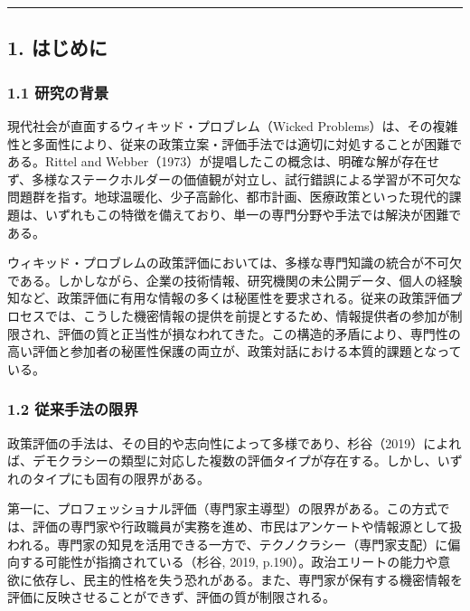 \begin{center}\rule{0.5\linewidth}{0.5pt}\end{center}

\subsection{1. はじめに}\label{ux306fux3058ux3081ux306b}

\subsubsection{1.1 研究の背景}\label{ux7814ux7a76ux306eux80ccux666f}

現代社会が直面するウィキッド・プロブレム（Wicked Problems）は、その複雑性と多面性により、従来の政策立案・評価手法では適切に対処することが困難である。Rittel and Webber（1973）が提唱したこの概念は、明確な解が存在せず、多様なステークホルダーの価値観が対立し、試行錯誤による学習が不可欠な問題群を指す。地球温暖化、少子高齢化、都市計画、医療政策といった現代的課題は、いずれもこの特徴を備えており、単一の専門分野や手法では解決が困難である。

ウィキッド・プロブレムの政策評価においては、多様な専門知識の統合が不可欠である。しかしながら、企業の技術情報、研究機関の未公開データ、個人の経験知など、政策評価に有用な情報の多くは秘匿性を要求される。従来の政策評価プロセスでは、こうした機密情報の提供を前提とするため、情報提供者の参加が制限され、評価の質と正当性が損なわれてきた。この構造的矛盾により、専門性の高い評価と参加者の秘匿性保護の両立が、政策対話における本質的課題となっている。

\subsubsection{1.2 従来手法の限界}\label{ux5f93ux6765ux624bux6cd5ux306eux9650ux754c}

政策評価の手法は、その目的や志向性によって多様であり、杉谷（2019）によれば、デモクラシーの類型に対応した複数の評価タイプが存在する。しかし、いずれのタイプにも固有の限界がある。

第一に、プロフェッショナル評価（専門家主導型）の限界がある。この方式では、評価の専門家や行政職員が実務を進め、市民はアンケートや情報源として扱われる。専門家の知見を活用できる一方で、テクノクラシー（専門家支配）に偏向する可能性が指摘されている（杉谷, 2019, p.190）。政治エリートの能力や意欲に依存し、民主的性格を失う恐れがある。また、専門家が保有する機密情報を評価に反映させることができず、評価の質が制限される。

